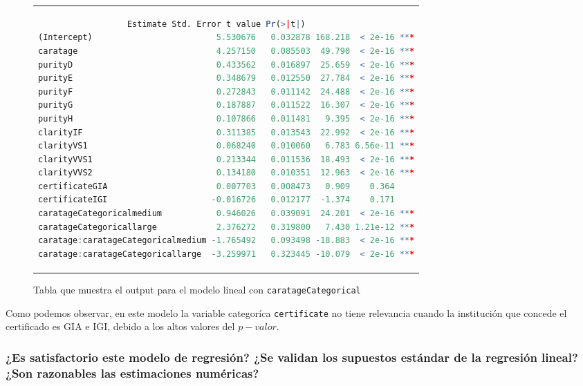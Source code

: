 \documentclass[a4paper, 7pt]{article}
\begin{document}
\begin{figure}[H]
    \centering
    \begin{tabular}{c}
        \begin{lstlisting}[basicstyle=\tiny, language=r]
                                    Estimate Std. Error t value Pr(>|t|)    
(Intercept)                         5.530676   0.032878 168.218  < 2e-16 ***
caratage                            4.257150   0.085503  49.790  < 2e-16 ***
purityD                             0.433562   0.016897  25.659  < 2e-16 ***
purityE                             0.348679   0.012550  27.784  < 2e-16 ***
purityF                             0.272843   0.011142  24.488  < 2e-16 ***
purityG                             0.187887   0.011522  16.307  < 2e-16 ***
purityH                             0.107866   0.011481   9.395  < 2e-16 ***
clarityIF                           0.311385   0.013543  22.992  < 2e-16 ***
clarityVS1                          0.068240   0.010060   6.783 6.56e-11 ***
clarityVVS1                         0.213344   0.011536  18.493  < 2e-16 ***
clarityVVS2                         0.134180   0.010351  12.963  < 2e-16 ***
certificateGIA                      0.007703   0.008473   0.909    0.364    
certificateIGI                     -0.016726   0.012177  -1.374    0.171    
caratageCategoricalmedium           0.946026   0.039091  24.201  < 2e-16 ***
caratageCategoricallarge            2.376272   0.319800   7.430 1.21e-12 ***
caratage:caratageCategoricalmedium -1.765492   0.093498 -18.883  < 2e-16 ***
caratage:caratageCategoricallarge  -3.259971   0.323445 -10.079  < 2e-16 ***
        \end{lstlisting}
    \end{tabular}
    \caption{Tabla que muestra el output para el modelo lineal con \texttt{caratageCategorical}}
    \label{fig:summary_model}
\end{figure}

Como podemos observar, en este modelo la variable categoríca \texttt{certificate} no tiene relevancia cuando la institución que concede el certificado es GIA e IGI, debido a los altos valores del $p-valor$.


\subsubsection{¿Es satisfactorio este modelo de regresión? ¿Se validan los supuestos estándar de la regresión lineal? ¿Son razonables las estimaciones numéricas?}
\end{document}
